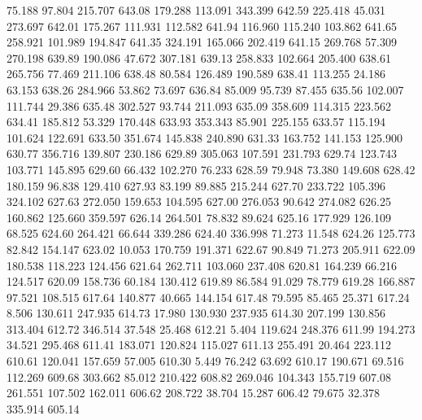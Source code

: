   75.188   97.804  215.707       643.08
 179.288  113.091  343.399       642.59
 225.418   45.031  273.697       642.01
 175.267  111.931  112.582       641.94
 116.960  115.240  103.862       641.65
 258.921  101.989  194.847       641.35
 324.191  165.066  202.419       641.15
 269.768   57.309  270.198       639.89
 190.086   47.672  307.181       639.13
 258.833  102.664  205.400       638.61
 265.756   77.469  211.106       638.48
  80.584  126.489  190.589       638.41
 113.255   24.186   63.153       638.26
 284.966   53.862   73.697       636.84
  85.009   95.739   87.455       635.56
 102.007  111.744   29.386       635.48
 302.527   93.744  211.093       635.09
 358.609  114.315  223.562       634.41
 185.812   53.329  170.448       633.93
 353.343   85.901  225.155       633.57
 115.194  101.624  122.691       633.50
 351.674  145.838  240.890       631.33
 163.752  141.153  125.900       630.77
 356.716  139.807  230.186       629.89
 305.063  107.591  231.793       629.74
 123.743  103.771  145.895       629.60
  66.432  102.270   76.233       628.59
  79.948   73.380  149.608       628.42
 180.159   96.838  129.410       627.93
  83.199   89.885  215.244       627.70
 233.722  105.396  324.102       627.63
 272.050  159.653  104.595       627.00
 276.053   90.642  274.082       626.25
 160.862  125.660  359.597       626.14
 264.501   78.832   89.624       625.16
 177.929  126.109   68.525       624.60
 264.421   66.644  339.286       624.40
 336.998   71.273   11.548       624.26
 125.773   82.842  154.147       623.02
  10.053  170.759  191.371       622.67
  90.849   71.273  205.911       622.09
 180.538  118.223  124.456       621.64
 262.711  103.060  237.408       620.81
 164.239   66.216  124.517       620.09
 158.736   60.184  130.412       619.89
  86.584   91.029   78.779       619.28
 166.887   97.521  108.515       617.64
 140.877   40.665  144.154       617.48
  79.595   85.465   25.371       617.24
   8.506  130.611  247.935       614.73
  17.980  130.930  237.935       614.30
 207.199  130.856  313.404       612.72
 346.514   37.548   25.468       612.21
   5.404  119.624  248.376       611.99
 194.273   34.521  295.468       611.41
 183.071  120.824  115.027       611.13
 255.491   20.464  223.112       610.61
 120.041  157.659   57.005       610.30
   5.449   76.242   63.692       610.17
 190.671   69.516  112.269       609.68
 303.662   85.012  210.422       608.82
 269.046  104.343  155.719       607.08
 261.551  107.502  162.011       606.62
 208.722   38.704   15.287       606.42
  79.675   32.378  335.914       605.14
